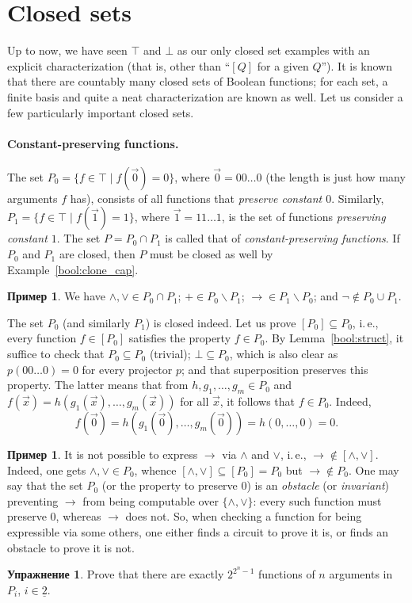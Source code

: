 \documentclass[12pt,notitlepage]{article}
\theoremstyle{plain}
\theoremstyle{definition}
\newtheorem{exc}[thm]{Упражнение}
\newtheorem{exm}[thm]{Пример}
\theoremstyle{plain}
\newcommand{\sbs}{\subseteq}
\renewcommand{\setminus}{\smallsetminus}
\newcommand{\ul}[1]{\underline{#1}}
\newcommand{\1}{\mathbf{1}}
\newcommand{\0}{\mathbf{0}}
\begin{document}
\section{Closed sets}
Up to now, we have seen $\top$ and $\bot$ as our only closed set examples with an explicit characterization (that is, other than ``$[Q]$ for a given $Q$''). It is known that there are countably many closed sets of Boolean functions; for each set, a finite basis and quite a neat characterization are known as well. Let us consider a few particularly important closed sets.

\paragraph{Constant-preserving functions.}
The set $P_0 = \{ f \in \top \mid f(\vec 0) = 0\}$, where $\vec 0 = 00\ldots0$ (the length is just how many arguments $f$ has), consists of all functions that \emph{preserve constant $0$}. Similarly, $P_1 = \{ f \in \top \mid f(\vec 1) = 1\}$,  where $\vec 1 = 11\ldots1$, is the set of functions \emph{preserving constant $1$}. The set $P = P_0 \cap P_1$ is called that of \emph{constant-preserving functions}. If $P_0$ and $P_1$ are closed, then $P$ must be closed as well by Example~\ref{bool:clone_cap}.

\begin{exm}
	We have ${\wedge}, {\vee} \in P_0 \cap P_1$; ${+} \in P_0 \setminus P_1$; ${\to} \in P_1 \setminus P_0$; and $\neg \notin P_0 \cup P_1$.
\end{exm}

The set $P_0$ (and similarly $P_1$) is closed indeed. Let us prove $[P_0] \sbs P_0$, i.\,e., every function $f \in [P_0]$ satisfies the property $f \in P_0$. By Lemma~\ref{bool:struct}, it suffice to check that $P_0 \sbs P_0$ (trivial); $\bot \sbs P_0$, which is also clear as $p(00\ldots0) = 0$ for every projector $p$; and that superposition preserves this property. The latter means that from $h, g_1, \ldots,g_m \in P_0$ and $f(\vec x) = h(g_1(\vec x),\ldots, g_m(\vec x))$ for all $\vec x$, it follows that $f \in P_0$. Indeed,
$$f(\vec 0) = h(g_1(\vec 0),\ldots, g_m(\vec 0)) = h(0, \ldots, 0) = 0.$$

\begin{exm}
	It is not possible to express ${\to}$ via ${\wedge}$ and ${\vee}$, i.\,e., ${\to} \notin [{\wedge}, {\vee}]$. Indeed, one gets ${\wedge}, {\vee} \in P_0$, whence $[{\wedge}, {\vee}] \sbs [P_0] = P_0$ but ${\to} \notin P_0$. One may say that the set $P_0$ (or the property to preserve $0$) is an \emph{obstacle} (or \emph{invariant}) preventing ${\to}$ from being computable over $\{{\wedge}, {\vee}\}$: every such function must preserve $0$, whereas ${\to}$ does not. So, when checking a function for being expressible via some others, one either finds a circuit to prove it is, or finds an obstacle to prove it is not. 
\end{exm}
\begin{exc}
	Prove that there are exactly $2^{2^n - 1}$ functions of $n$ arguments in $P_i$, $i \in \ul{2}$.
\end{exc}
\end{document}
